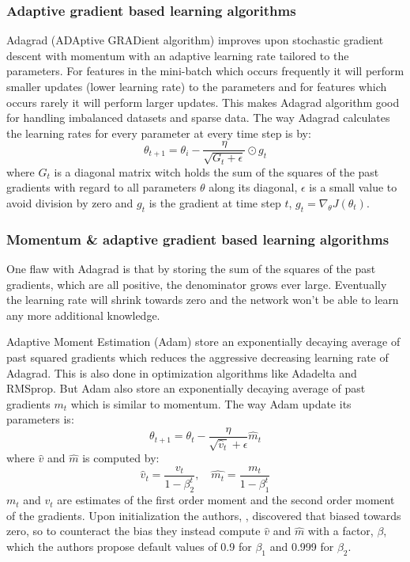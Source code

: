 \documentclass[thesis.tex]{subfiles}
\begin{document}
\subsubsection{Adaptive gradient based learning algorithms}
Adagrad (ADAptive GRADient algorithm) \cite{AdaptiveSubgradient11} improves upon stochastic gradient descent with momentum with an adaptive learning rate tailored to the parameters. For features in the mini-batch which occurs frequently it will perform smaller updates (lower learning rate) to the parameters and for features which occurs rarely it will perform larger updates. This makes Adagrad algorithm good for handling imbalanced datasets and sparse data. The way Adagrad calculates the learning rates for every parameter at every time step is by:
$$ \theta_{t+1} = \theta_i - \frac{\eta}{\sqrt{G_t + \epsilon}} \odot g_t $$
where $G_t$ is a diagonal matrix witch holds the sum of the squares of the past gradients with regard to all parameters $\theta$ along its diagonal, $\epsilon$ is a small value to avoid division by zero and $g_t$ is the gradient at time step $t$, $g_t = \nabla_\theta J(\theta_t)$.

\subsubsection{Momentum \& adaptive gradient based learning algorithms}
One flaw with Adagrad is that by storing the sum of the squares of the past gradients, which are all positive, the denominator grows ever large. Eventually the learning rate will shrink towards zero and the network won't be able to learn any more additional knowledge.

Adaptive Moment Estimation (Adam) \cite{AdamMethod17} store an exponentially decaying average of past squared gradients which reduces the aggressive decreasing learning rate of Adagrad. This is also done in optimization algorithms like Adadelta and RMSprop. But Adam also store an exponentially decaying average of past gradients $m_t$ which is similar to momentum. The way Adam update its parameters is:
$$ \theta_{t+1} = \theta_t - \frac{\eta}{\sqrt{\hat{v}_t}+\epsilon}\hat{m}_t $$
where $\hat{v}$ and $\hat{m}$ is computed by:
$$ \hat{v}_t = \frac{v_t}{1-\beta^t_2}, \quad \hat{m_t} = \frac{m_t}{1-\beta^t_1} $$
$m_t$ and $v_t$ are estimates of the first order moment and the second order moment of the gradients. Upon initialization the authors, \citeauthor{AdamMethod17}, discovered that biased towards zero, so to counteract the bias they instead compute $\hat{v}$ and $\hat{m}$ with a factor, $\beta$, which the authors propose default values of 0.9 for $\beta_1$ and 0.999 for $\beta_2$.
\end{document}
